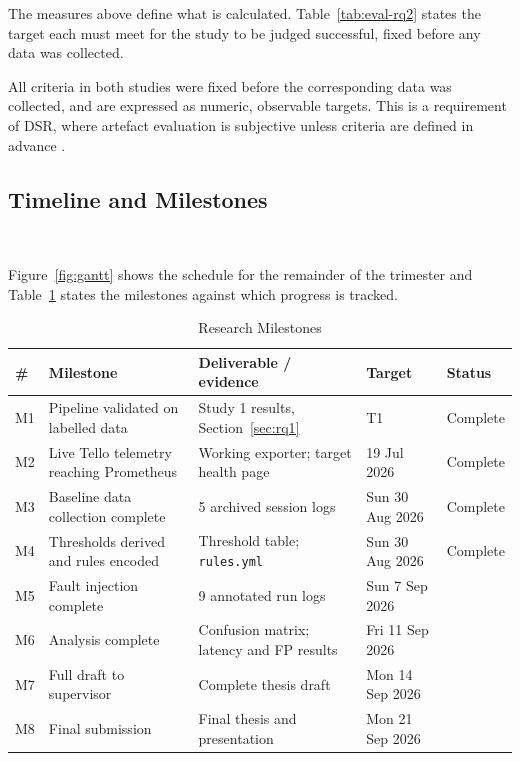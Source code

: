 The measures above define what is calculated. Table~\ref{tab:eval-rq2} states
the target each must meet for the study to be judged successful, fixed before
any data was collected.

All criteria in both studies were fixed before the corresponding data was
collected, and are expressed as numeric, observable targets. This is a
requirement of DSR, where artefact evaluation is subjective unless criteria are
defined in advance \citep{hevner2004}.

\subsection{Timeline and Milestones}~\label{subsec:method-timeline}

Figure~\ref{fig:gantt} shows the schedule for the remainder
of the trimester and Table~\ref{tab:milestones} states the milestones against
which progress is tracked.


\begin{table}[htbp]
\centering
\caption{Research Milestones}
\label{tab:milestones}
\small
\begin{tabular}{|p{0.6cm}|p{4cm}|p{5cm}|p{2.2cm}|p{1.7cm}|}
\hline
\textbf{\#} & \textbf{Milestone} & \textbf{Deliverable / evidence} & \textbf{Target} & \textbf{Status} \\
\hline
M1 & Pipeline validated on labelled data & Study 1 results, Section~\ref{sec:rq1} & T1 & Complete \\
\hline
M2 & Live Tello telemetry reaching Prometheus & Working exporter; target health page & 19 Jul 2026 & Complete \\
\hline
M3 & Baseline data collection complete & 5 archived session logs & Sun 30 Aug 2026 & Complete \\
\hline
M4 & Thresholds derived and rules encoded & Threshold table; \texttt{rules.yml} & Sun 30 Aug 2026 & Complete \\
\hline
M5 & Fault injection complete & 9 annotated run logs & Sun 7 Sep 2026 & \\
\hline
M6 & Analysis complete & Confusion matrix; latency and FP results & Fri 11 Sep 2026 & \\
\hline
M7 & Full draft to supervisor & Complete thesis draft & Mon 14 Sep 2026 & \\
\hline
M8 & Final submission & Final thesis and presentation & Mon 21 Sep 2026 & \\
\hline
\end{tabular}
\end{table}

